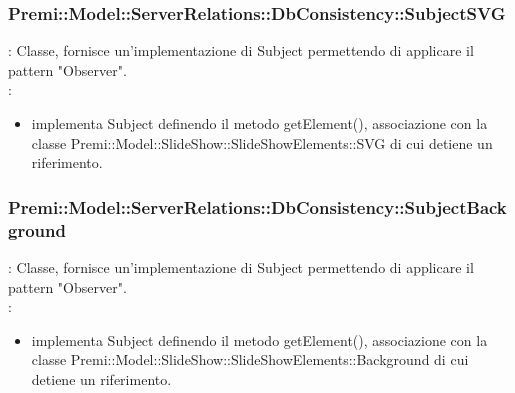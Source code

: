 {            \subsubsection{Premi::Model::ServerRelations::DbConsistency::SubjectSVG}{
				\textbf{\tipo}: Classe, fornisce un’implementazione di Subject permettendo di applicare il pattern "Observer".\\	
				\textbf{\relaz}: 
				\begin{itemize}
					\item implementa Subject definendo il metodo getElement(), associazione con la classe Premi::Model::SlideShow::SlideShowElements::SVG di cui detiene un riferimento.
				\end{itemize}	
            }
            
             \subsubsection{Premi::Model::ServerRelations::DbConsistency::SubjectBackground}{
				\textbf{\tipo}: Classe, fornisce un’implementazione di Subject permettendo di applicare il pattern "Observer".\\	
				\textbf{\relaz}: 
				\begin{itemize}
					\item implementa Subject definendo il metodo getElement(), associazione con la classe Premi::Model::SlideShow::SlideShowElements::Background di cui detiene un riferimento.
				\end{itemize}	
            }

}

